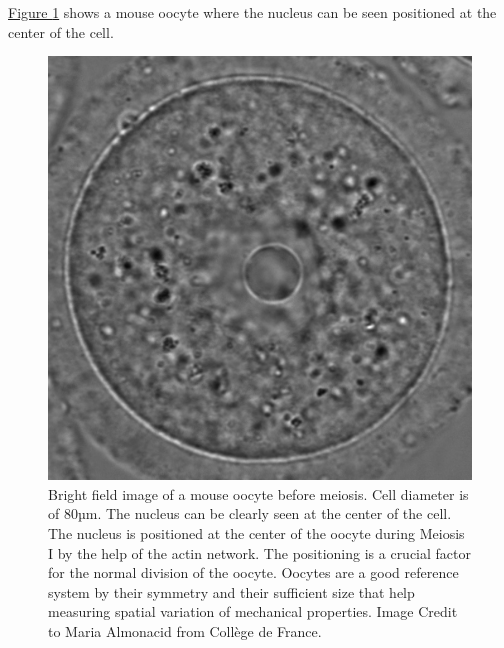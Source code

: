 \documentclass[A4paperpaper,11pt,english]{sphinxmanual}
\begin{document}
\hyperref[parts/part5:oocytewt]{Figure  \ref*{parts/part5:oocytewt}} shows a mouse
oocyte where the nucleus can be seen positioned at the center of the cell.
\begin{figure}[htbp]
\centering
\capstart

\includegraphics[width=0.600\linewidth]{oocyte-wild-type.png}
\caption{Bright field image of a mouse oocyte before meiosis. Cell diameter is of
80µm. The nucleus can be clearly seen at the center of the cell. The
nucleus is positioned at the center of the oocyte during Meiosis I by the
help of the actin network. The positioning is a crucial factor for the
normal division of the oocyte.  Oocytes are a good reference system  by
their symmetry and their sufficient size that help measuring spatial
variation of mechanical properties.  Image Credit to Maria Almonacid from
Collège de France.}\label{parts/part5:oocytewt}\end{figure}
\end{document}
